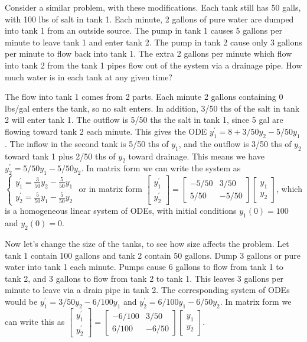 \documentclass[10pt]{article}
\theoremstyle{plain}
\theoremstyle{box}
\begin{document}
Consider a similar problem, with these modifications.  Each tank still has 50 galls, with 100 lbs of salt in tank 1.  Each minute, 2 gallons of pure water are dumped into tank 1 from an outside source. The pump in tank 1 causes 5 gallons per minute to leave tank 1 and enter tank 2.  The pump in tank 2 cause only 3 gallons per minute to flow back into tank 1. The extra 2 gallons per minute which flow into tank 2 from the tank 1 pipes flow out of the system via a drainage pipe.  How much water is in each tank at any given time?

The flow into tank 1 comes from 2 parts. Each minute 2 gallons containing 0 lbs/gal enters the tank, so no salt enters.  In addition, 3/50 ths of the salt in tank 2 will enter tank 1.  The outflow is 5/50 ths the salt in tank 1, since 5 gal are flowing toward tank 2 each minute.  This gives the ODE $y_1^\prime = 8+3/50 y_2 - 5/50 y_1$.  The inflow in the second tank is 5/50 ths of $y_1$, and the outflow is 3/50 ths of $y_2$ toward tank 1 plus 2/50 ths of $y_2$ toward drainage.  This means we have $y_2^\prime = 5/50 y_1 -5/50 y_2$.  In matrix form we can write the system as 
$\begin{cases}
y_1^\prime = \frac{3}{50}y_2 - \frac{5}{50}y_1\\
y_2^\prime = \frac{5}{50}y_1 - \frac{5}{50}y_2
\end{cases}$ or in matrix form 
$
\begin{bmatrix}
y_1^\prime\\
y_2^\prime
\end{bmatrix}
=
\begin{bmatrix}
-5/50&3/50\\
5/50&-5/50
\end{bmatrix}
\begin{bmatrix}
y_1\\
y_2
\end{bmatrix}
$, which is a homogeneous linear system of ODEs, with initial conditions $y_1(0)=100$ and $y_2(0)=0$. 

Now let's change the size of the tanks, to see how size affects the problem.  Let tank 1 contain 100 gallons and tank 2 contain 50 gallons. Dump 3 gallons or pure water into tank 1 each minute.  Pumps cause 6 gallons to flow from tank 1 to tank 2, and 3 gallons to flow from tank 2 to tank 1.  This leaves 3 gallons per minute to leave via a drain pipe in tank 2. The corresponding system of ODEs would be $y_1^\prime = 3/50 y_2 - 6/100 y_1$ and $y_2^\prime = 6/100 y_1 - 6/50 y_2$. In matrix form we can write this as  
$
\begin{bmatrix}
y_1^\prime\\
y_2^\prime
\end{bmatrix}
=
\begin{bmatrix}
-6/100&3/50\\
6/100&-6/50
\end{bmatrix}
\begin{bmatrix}
y_1\\
y_2
\end{bmatrix}
$.
 
\end{document}
